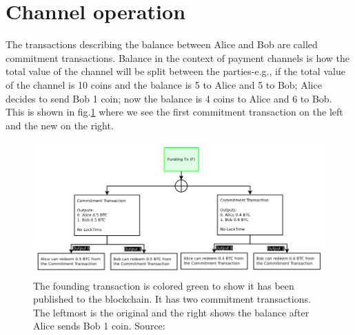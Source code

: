 \documentclass[informationsecurity]{gucmasterproject}
\begin{document}
\section{Channel operation}

The transactions describing the balance between Alice and Bob are called commitment transactions. Balance in the context of payment channels is how the total value of the channel will be split between the parties-e.g., if the total value of the channel is 10 coins and the balance is 5 to Alice and 5 to Bob; Alice decides to send Bob 1 coin; now the balance is 4 coins to Alice and 6 to Bob. This is shown in fig.\ref{fig:ln_commit} where we see the first commitment transaction on the left and the new on the right.

\begin{figure}[h]
    \centering
    \includegraphics[width=12cm]{ln_commit.png}
    \caption{The founding transaction is colored green to show it has been published to the blockchain. It has two commitment transactions. The leftmost is the original and the right shows the balance after Alice sends Bob 1 coin. Source: \cite{poon2015bitcoin}}
    \label{fig:ln_commit}
\end{figure}
\end{document}

